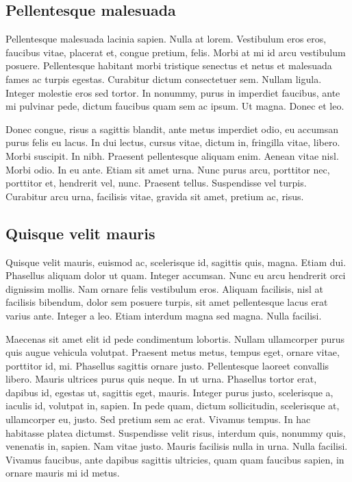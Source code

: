 \documentclass[MSc, ida]{histhesis}
\begin{document}
\subsection{Pellentesque malesuada}

Pellentesque malesuada lacinia sapien. Nulla at lorem. Vestibulum eros eros,
faucibus vitae, placerat et, congue pretium, felis. Morbi at mi id arcu
vestibulum posuere. Pellentesque habitant morbi tristique senectus et netus et
malesuada fames ac turpis egestas. Curabitur dictum consectetuer sem. Nullam
ligula. Integer molestie eros sed tortor. In nonummy, purus in imperdiet
faucibus, ante mi pulvinar pede, dictum faucibus quam sem ac ipsum. Ut magna.
Donec et leo.

Donec congue, risus a sagittis blandit, ante metus imperdiet odio, eu accumsan
purus felis eu lacus. In dui lectus, cursus vitae, dictum in, fringilla vitae,
libero. Morbi suscipit. In nibh. Praesent pellentesque aliquam enim. Aenean
vitae nisl. Morbi odio. In eu ante. Etiam sit amet urna. Nunc purus arcu,
porttitor nec, porttitor et, hendrerit vel, nunc. Praesent tellus. Suspendisse
vel turpis. Curabitur arcu urna, facilisis vitae, gravida sit amet, pretium ac,
risus.


\subsection{Quisque velit mauris}

Quisque velit mauris, euismod ac, scelerisque id, sagittis quis, magna. Etiam
dui. Phasellus aliquam dolor ut quam. Integer accumsan. Nunc eu arcu hendrerit
orci dignissim mollis. Nam ornare felis vestibulum eros. Aliquam facilisis,
nisl at facilisis bibendum, dolor sem posuere turpis, sit amet pellentesque
lacus erat varius ante. Integer a leo. Etiam interdum magna sed magna. Nulla
facilisi.

Maecenas sit amet elit id pede condimentum lobortis. Nullam ullamcorper purus
quis augue vehicula volutpat. Praesent metus metus, tempus eget, ornare vitae,
porttitor id, mi. Phasellus sagittis ornare justo. Pellentesque laoreet
convallis libero. Mauris ultrices purus quis neque. In ut urna. Phasellus
tortor erat, dapibus id, egestas ut, sagittis eget, mauris. Integer purus
justo, scelerisque a, iaculis id, volutpat in, sapien. In pede quam, dictum
sollicitudin, scelerisque at, ullamcorper eu, justo. Sed pretium sem ac erat.
Vivamus tempus. In hac habitasse platea dictumst. Suspendisse velit risus,
interdum quis, nonummy quis, venenatis in, sapien. Nam vitae justo. Mauris
facilisis nulla in urna. Nulla facilisi. Vivamus faucibus, ante dapibus
sagittis ultricies, quam quam faucibus sapien, in ornare mauris mi id metus.
\end{document}
